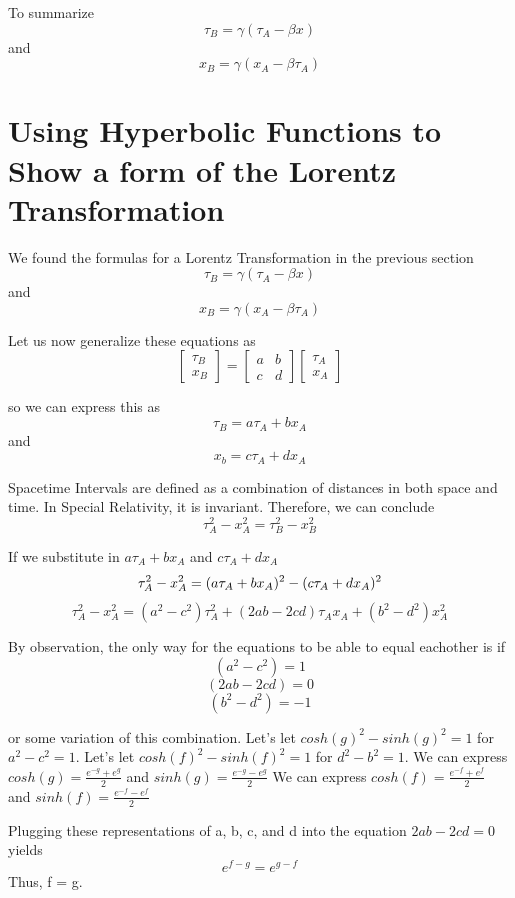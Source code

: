 \documentclass{article}
\begin{document}
To summarize
\[
  \tau_B = \gamma ( \tau_A - \beta x)
\]
and
\[
  x_B = \gamma (x_A - \beta \tau_A)
\]
\newpage
\section{Using Hyperbolic Functions to Show a form of the Lorentz Transformation}
We found the formulas for a Lorentz Transformation in the previous section
\[
  \tau_B = \gamma ( \tau_A - \beta x)
\]
and
\[
  x_B = \gamma (x_A - \beta \tau_A)
\]

Let us now generalize these equations as
\[
  \begin{bmatrix} 
    \tau_B \\
    x_B
  \end{bmatrix}
=
  \begin{bmatrix} 
    a & b \\
    c & d
  \end{bmatrix}
  \begin{bmatrix} 
    \tau_A \\
    x_A
  \end{bmatrix}
\]

so we can express this as
\[
  \tau_B = a\tau_A + bx_A
\]
and 
\[
  x_b = c\tau_A + dx_A
\]

Spacetime Intervals are defined as a combination of distances in both space and time. In Special Relativity, it is invariant. Therefore, we can conclude
\[
  \tau_A^2 - x_A^2 = \tau_B^2 - x_B^2
\]

If we substitute in \(a\tau_A + bx_A\) and \(c\tau_A + dx_A\)
\[
  \tau_A^2 - x_A^2 = (a\tau_A + bx_A)^2 - (c\tau_A + dx_A)^2 \newline
\]
\[
  \tau_A^2 - x_A^2 = (a^2 - c^2)\tau_A^2 + (2ab - 2cd)\tau_A x_A + (b^2 - d^2) x_A^2
\]

By observation, the only way for the equations to be able to equal eachother is if
\[
  (a^2 - c^2) = 1
\]
\[
  (2ab - 2cd) = 0
\]
\[
  (b^2 - d^2) = -1
\]

or some variation of this combination. \newline
Let's let \(cosh(g)^2 - sinh(g)^2 = 1\) for \(a^2 - c^2 = 1\). \newline
Let's let \(cosh(f)^2 - sinh(f)^2 = 1\) for \(d^2 - b^2 = 1\). \newline
We can express \(cosh(g) = \frac{e^{-g} + e^{g}}{2}\) and \(sinh(g) = \frac{e^{-g} - e^{g}}{2}\) \newline
We can express \(cosh(f) = \frac{e^{-f} + e^{f}}{2}\) and \(sinh(f) = \frac{e^{-f} - e^{f}}{2}\) \newline

Plugging these representations of a, b, c, and d into the equation \(2ab - 2cd = 0\) yields
\[
  e^{f - g} = e^{g - f}
\]
Thus, f = g.
\end{document}
